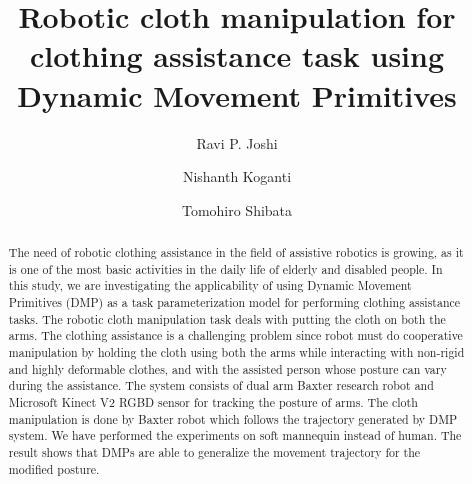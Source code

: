 \documentclass[sigconf]{acmart}
\begin{document}
\title{Robotic cloth manipulation for clothing assistance task using Dynamic Movement
Primitives}


\author{Ravi P. Joshi}
\affiliation{%
}

\author{Nishanth Koganti}
\affiliation{%
}

\author{Tomohiro Shibata}
\affiliation{%
}

\graphicspath{{./images/}}

\begin{abstract}
	The need of robotic clothing assistance in the field of assistive robotics is growing, as it is one of the most basic activities in the daily life of elderly and disabled people. In this study, we are investigating the applicability of using Dynamic Movement Primitives (DMP) as a task parameterization model for performing clothing assistance tasks. The robotic cloth manipulation task deals with putting the cloth on both the arms. The clothing assistance is a challenging problem since robot must do cooperative manipulation by holding the cloth using both the arms while interacting with non-rigid and highly deformable clothes, and with the assisted person whose posture can vary during the assistance. The system consists of dual arm Baxter research robot and Microsoft Kinect V2 RGBD sensor for tracking the posture of arms. The cloth manipulation is done by Baxter robot which follows the trajectory generated by DMP system. We have performed the experiments on soft mannequin instead of human. The result shows that DMPs are able to generalize the movement trajectory for the modified posture.
\end{abstract}
\end{document}
